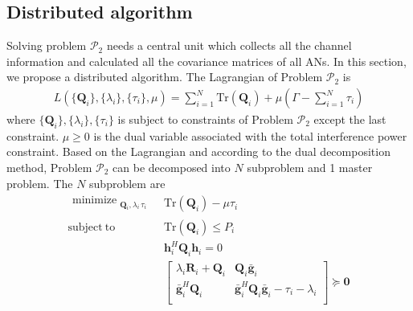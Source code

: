 \documentclass[conference]{IEEEtran}
\begin{document}
\subsection{Distributed algorithm} \label{sec:distributed algorithm}
Solving problem $\mathcal{P}_2$ needs a central unit which collects all the channel information and calculated all the covariance matrices of all ANs. In this section, we propose a distributed algorithm. The Lagrangian of Problem $\mathcal{P}_2$ is 
\begin{eqnarray}
L(\{\mathbf{Q}_{i}\}, \{\lambda_i\},\{\tau_i\},\mu)= \sum_{i=1}^{N}\mathrm{Tr}(\mathbf{Q}_i) + \mu(\Gamma - \sum_{i=1}^{N}\tau_i)
\end{eqnarray} 
where $\{\mathbf{Q}_{i}\}, \{\lambda_i\},\{\tau_i\}$ is subject to constraints of Problem $\mathcal{P}_2$ except the last constraint. $\mu \geq 0$ is the dual variable associated with the total interference power constraint.
Based on the Lagrangian and according to the dual decomposition method, Problem $\mathcal{P}_2$ can be decomposed into $N$ subproblem and 1 master problem. The $N$ subproblem are
\begin{equation}\label{eq:subproblem}
\begin{array}{ll}
\begin{split}
\mathop{\text{minimize}}_{\substack{\mathbf{Q}_{i}, \lambda_i\,\tau_i}} 
\end{split}  
& \mathrm{Tr}(\mathbf{Q}_i) - \mu\tau_i\\
\mathrm{subject~to} &\mathrm{Tr}(\mathbf{Q}_i) \leq P_i\\
& \mathbf{h}_i^H\mathbf{Q}_i\mathbf{h}_i= 0\\
&\left[ {\begin{array}{cc}
	\lambda_i\mathbf{R}_i+\mathbf{Q}_i  & \mathbf{Q}_i\bar{\mathbf{g}}_i \\
	\bar{\mathbf{g}}_i^H\mathbf{Q}_i & \bar{\mathbf{g}}_i^H\mathbf{Q}_i\bar{\mathbf{g}}_i - \tau_i -\lambda_i\\
	\end{array} } \right] \succeq \mathbf{0}
\end{array}
\end{equation}
\end{document}
